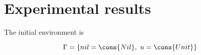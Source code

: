 \section{Experimental results}\label{sec:experimental}

\newcommand{\nil}{\cons{Nil}}
\newcommand{\unit}{\cons{Unit}}
\newcommand{\true}{\cons{True}}
\newcommand{\false}{\cons{False}}
\newcommand{\retTrue}{\matchreturn{\true}}
\newcommand{\retFalse}{\matchreturn{\false}}
\newcommand{\isShortBody}{\matchalt{\matchpat{(x : y : ys)}{\retFalse}}{\matchpat{ys}{\retTrue}}}
\newcommand{\isShortPMC}{\ensuremath{\isShort}}
\newcommand{\listu}{(u : nil)}
\newcommand{\singlePMC}{\abstr{(\matchpat{x}{\matchreturn{(x : nil)}})}}
\newcommand{\retSingle}{\matchreturn{(x : nil)}}
\newcommand{\matchNilList}{\matcharg{nil}{\matchpat{(y : ys)}{\retFalse}}}
\newcommand{\isShort}{\textit{isShort}}
\newcommand{\single}{\textit{single}}

The initial environment is

\[
    \Gamma = \{ nil = \nil,\ u = \unit \}
\]

